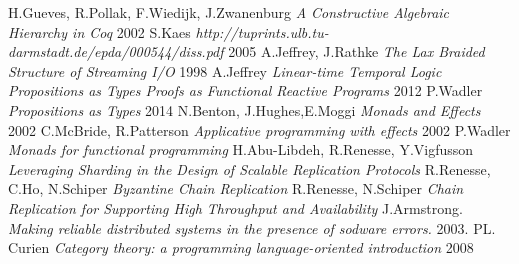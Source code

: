 \documentclass[11pt,oneside]{article}
\begin{document}
\begin{thebibliography}{9}
   H.Gueves, R.Pollak, F.Wiedijk, J.Zwanenburg \textit{A Constructive Algebraic Hierarchy in Coq} 2002
     S.Kaes \textit{http://tuprints.ulb.tu-darmstadt.de/epda/000544/diss.pdf} 2005
   A.Jeffrey, J.Rathke \textit{The Lax Braided Structure of Streaming I/O} 1998
     A.Jeffrey \textit{Linear-time Temporal Logic Propositions as Types Proofs as Functional Reactive Programs} 2012
   P.Wadler \textit{Propositions as Types} 2014
       N.Benton, J.Hughes,E.Moggi \textit{Monads and Effects} 2002
   C.McBride, R.Patterson \textit{Applicative programming with effects} 2002
      P.Wadler \textit{Monads for functional programming} 
 H.Abu-Libdeh, R.Renesse, Y.Vigfusson \textit{Leveraging Sharding in the Design of Scalable Replication Protocols}
 R.Renesse, C.Ho, N.Schiper \textit{Byzantine Chain Replication}
 R.Renesse, N.Schiper \textit{Chain Replication for Supporting High Throughput and Availability}
      J.Armstrong. \textit{Making reliable distributed systems in the presence of sodware errors.} 2003.
 PL. Curien \textit{Category theory: a programming language-oriented introduction} 2008


\end{thebibliography}
\end{document}
